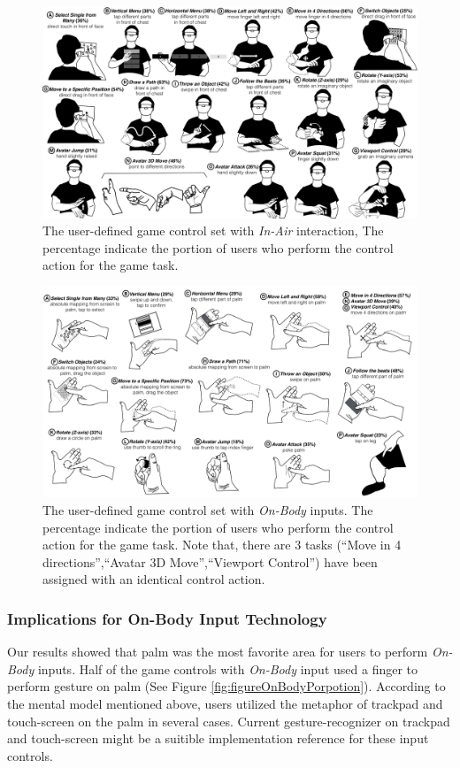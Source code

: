 \documentclass{sigchi}
\begin{document}
   \begin{figure}
  \centering
  \includegraphics[width=1\textwidth]{InAirSet.pdf}
  \caption{The user-defined game control set with \emph{In-Air} interaction, The percentage indicate the portion of users who perform the control action for the game task.}
  \label{fig:InAirSet}
  \end{figure}


  \begin{figure}
  \centering
  \includegraphics[width=1\textwidth]{OnBodyInputSet.pdf}
  \caption{The user-defined game control set with \emph{On-Body} inputs. The percentage indicate the portion of users who perform the control action for the game task. Note that, there are 3 tasks (``Move in 4 directions'',``Avatar 3D Move'',``Viewport Control'') have been assigned with an identical control action.}
  \label{fig:OnBodyInputSet}
  \end{figure}


    \subsubsection{Implications for On-Body Input Technology}
    Our results showed that palm was the most favorite area for users to perform \emph{On-Body} inputs. Half of the game controls with \emph{On-Body} input used a finger to perform gesture on palm (See Figure \ref{fig:figureOnBodyPorpotion}). According to the mental model mentioned above, users utilized the metaphor of trackpad and touch-screen on the palm in several cases. Current gesture-recognizer on trackpad and touch-screen might be a suitible implementation reference for these input controls.
\end{document}
